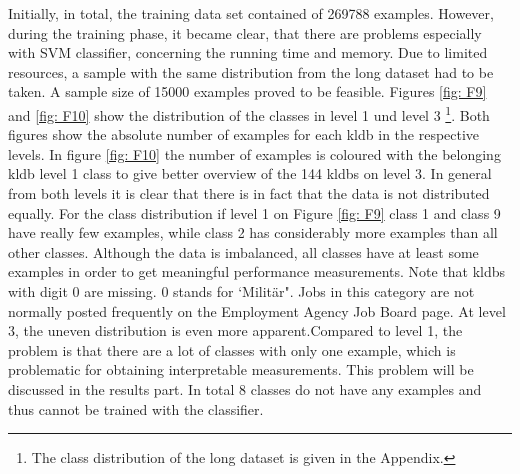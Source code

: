 \documentclass[12pt, a4paper, titlepage]{article}
\begin{document}
Initially, in total, the training data set contained of 269788 examples. However, during the training phase, it became clear, that there are problems especially with \ac{SVM} classifier, concerning the running time and memory. Due to limited resources, a sample with the same distribution from the long dataset had to be taken. A sample size of 15000 examples proved to be feasible. Figures \ref{fig: F9} and \ref{fig: F10} show the distribution of the classes in level 1 und level 3 \footnote{The class distribution of the long dataset is given in the Appendix.}. Both figures show the absolute number of examples for each kldb in the respective levels. In figure \ref{fig: F10}  the number of examples is coloured with the belonging kldb level 1 class to give better overview of the 144 kldbs on level 3. In general from both levels it is clear that there is in fact that the data is not distributed equally. For the class distribution if level 1 on Figure \ref{fig: F9} class 1 and class 9 have really few examples, while class 2 has considerably more examples than all other classes. Although the data is imbalanced, all classes have at least some examples in order to get meaningful performance measurements. Note that kldbs with digit 0 are missing. 0 stands for `Militär". Jobs in this category are not normally posted frequently on the Employment Agency Job Board page. At level 3, the uneven distribution is even more apparent.Compared to level 1, the problem is that there are a lot of classes with only one example, which is problematic for obtaining interpretable measurements. This problem will be discussed in the results part. In total 8 classes do not have any examples and thus cannot be trained with the classifier.  
\end{document}
